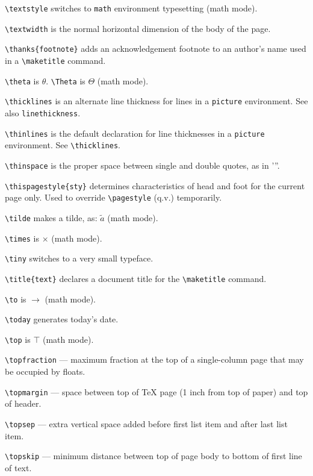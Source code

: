 \verb"\textstyle" switches to \verb"math" environment typesetting (math mode).

\verb"\textwidth" is the normal horizontal dimension of the body of the page.

\verb"\thanks{footnote}" adds an acknowledgement footnote to an author's
	name used in a \verb"\maketitle" command.

\verb"\theta" is $\theta$. \verb"\Theta" is $\Theta$ (math mode).

\verb"\thicklines" is an alternate line thickness for lines in a \verb"picture"
	environment.  See also \verb"linethickness".

\verb"\thinlines" is the default declaration for line thicknesses in a
	\verb"picture" environment.  See \verb"\thicklines".

\verb"\thinspace" is the proper space between single and double quotes, as
	in '\thinspace''.

\verb"\thispagestyle{sty}" determines characteristics of
	head and foot for the current page only.  Used to
	override \verb"\pagestyle" (q.v.) temporarily.

\verb"\tilde" makes a tilde, as: $\tilde a$ (math mode).

\verb"\times" is $\times$ (math mode).

\verb"\tiny" switches to a very small typeface.

\verb"\title{text}" declares a document title for the \verb"\maketitle" command.

\verb"\to" is $\to$ (math mode).

\verb"\today" generates today's date.

\verb"\top" is $\top$ (math mode).

\verb"\topfraction" --- maximum fraction at the top of a single-column
	page that may be occupied by floats.

\verb"\topmargin" --- space between top of \TeX{} page (1 inch from top of
	paper) and top of header.

\verb"\topsep" --- extra vertical space added before first list item and
	after last list item.

\verb"\topskip" --- minimum distance between top of page body to bottom
	of first line of text.


